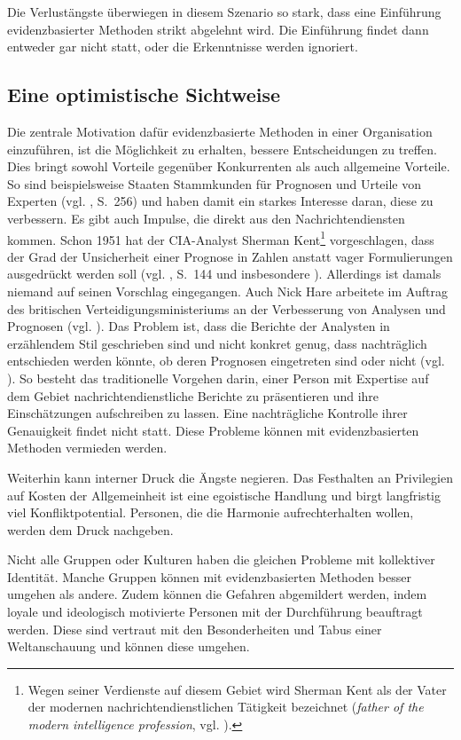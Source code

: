 Die Verlustängste überwiegen in diesem Szenario so stark, dass eine Einführung
evidenzbasierter Methoden strikt abgelehnt wird. Die Einführung findet dann
entweder gar nicht statt, oder die Erkenntnisse werden ignoriert.

\subsection{Eine optimistische Sichtweise}

Die zentrale Motivation dafür evidenzbasierte Methoden in einer Organisation
einzuführen, ist die Möglichkeit zu erhalten, bessere Entscheidungen zu treffen.
Dies bringt sowohl Vorteile gegenüber Konkurrenten als auch allgemeine Vorteile. So sind beispielsweise Staaten Stammkunden
für Prognosen und Urteile von Experten (vgl. \cite{Roetheli}, S.~256) und haben damit ein
starkes Interesse daran, diese zu verbessern. Es gibt auch Impulse, die direkt aus den Nachrichtendiensten
kommen. Schon 1951 hat der CIA-Analyst Sherman Kent\footnote{
Wegen seiner Verdienste auf diesem Gebiet wird Sherman Kent als der Vater der modernen
nachrichtendienstlichen Tätigkeit bezeichnet (\emph{father of the modern intelligence profession},
vgl. \cite{Ford}).
} vorgeschlagen, dass der Grad der Unsicherheit einer Prognose in Zahlen anstatt vager Formulierungen
ausgedrückt werden soll (vgl. \cite{Roche}, S.~144 und insbesondere \cite{Kent}).
Allerdings ist damals niemand auf seinen Vorschlag eingegangen. Auch Nick Hare
arbeitete im Auftrag des britischen Verteidigungsministeriums an der Verbesserung von Analysen und
Prognosen (vgl. \cite{Burton}). Das Problem ist, dass die Berichte der Analysten in erzählendem Stil
geschrieben sind und nicht konkret genug, dass nachträglich entschieden werden könnte, ob deren Prognosen
eingetreten sind oder nicht (vgl. \cite{Burton}). So besteht das traditionelle Vorgehen darin, einer
Person mit Expertise auf dem Gebiet nachrichtendienstliche Berichte zu präsentieren und ihre Einschätzungen
aufschreiben zu lassen. Eine nachträgliche Kontrolle ihrer Genauigkeit findet nicht statt. Diese Probleme
können mit evidenzbasierten Methoden vermieden werden.

Weiterhin kann interner Druck die Ängste negieren.
Das Festhalten an Privilegien auf Kosten der Allgemeinheit ist eine
egoistische Handlung und birgt langfristig viel Konfliktpotential. Personen, die die
Harmonie aufrechterhalten wollen, werden dem Druck nachgeben. 

Nicht alle Gruppen oder Kulturen haben die gleichen Probleme mit kollektiver Identität.
Manche Gruppen können mit evidenzbasierten Methoden besser umgehen als andere.
Zudem können die Gefahren abgemildert werden, indem loyale und ideologisch motivierte
Personen mit der Durchführung beauftragt werden. Diese sind vertraut mit den
Besonderheiten und Tabus einer Weltanschauung und können diese umgehen.

